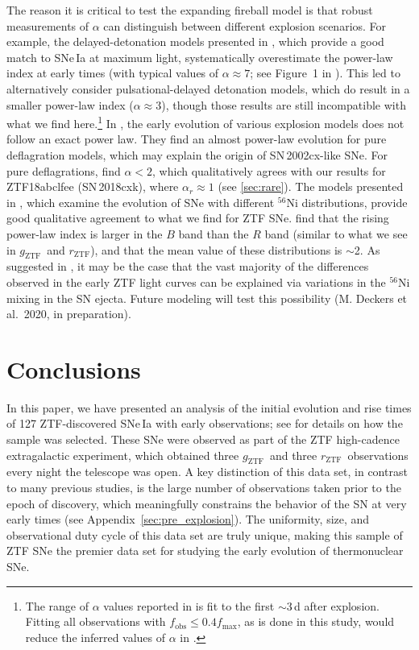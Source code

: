 \documentclass[twocolumn]{./aastex63}
\newcommand{\rztf}{$r_\mathrm{ZTF}$}
\newcommand{\gztf}{$g_\mathrm{ZTF}$}
\begin{document}
The reason it is critical to test the expanding fireball model is that robust
measurements of $\alpha$ can distinguish between different explosion
scenarios. For example, the delayed-detonation models presented in
\citet{Blondin13}, which provide a good match to SNe\,Ia at maximum light,
systematically overestimate the power-law index at early times (with typical
values of $\alpha \approx 7$; see Figure~1 in \citet{Dessart14}). This led
\citet{Dessart14} to alternatively consider pulsational-delayed detonation
models, which do result in a smaller power-law index ($\alpha \approx 3$),
though those results are still incompatible with what we find
here.\footnote{The range of $\alpha$ values reported in \citet{Dessart14} is
fit to the first $\sim$3\,d after explosion. Fitting all observations with
$f_\mathrm{obs} \leq 0.4 f_\mathrm{max}$, as is done in this study, would
reduce the inferred values of $\alpha$ in \citet{Dessart14}.} In
\citet{Noebauer17}, the early evolution of various explosion models does not
follow an exact power law. They find an almost power-law evolution for pure
deflagration models, which may explain the origin of SN\,2002cx-like SNe. For
pure deflagrations, \citet{Noebauer17} find $\alpha < 2$, which qualitatively
agrees with our results for ZTF18abclfee (SN\,2018cxk), where $\alpha_r
\approx 1$ (see \ref{sec:rare}). The models presented in \citet{Magee20},
which examine the evolution of SNe with different $^{56}$Ni distributions,
provide good qualitative agreement to what we find for ZTF SNe.
\citet{Magee20} find that the rising power-law index is larger in the $B$ band
than the $R$ band (similar to what we see in \gztf\ and \rztf), and that the
mean value of these distributions is $\sim$2. As suggested in \citet{Magee20},
it may be the case that the vast majority of the differences observed in the
early ZTF light curves can be explained via variations in the $^{56}$Ni mixing
in the SN ejecta. Future modeling will test this possibility (M. Deckers et
al.\ 2020, in preparation).

\section{Conclusions}

In this paper, we have presented an analysis of the initial evolution and rise
times of 127 ZTF-discovered SNe\,Ia with early observations; see \citet{Yao19}
for details on how the sample was selected. These SNe were observed as part of
the ZTF high-cadence extragalactic experiment, which obtained three \gztf\ and
three \rztf\ observations every night the telescope was open. A key
distinction of this data set, in contrast to many previous studies, is the
large number of observations taken prior to the epoch of discovery, which
meaningfully constrains the behavior of the SN at very early times (see
Appendix~\ref{sec:pre_explosion}). The uniformity, size, and observational
duty cycle of this data set are truly unique, making this sample of ZTF SNe
the premier data set for studying the early evolution of thermonuclear SNe.
\end{document}
